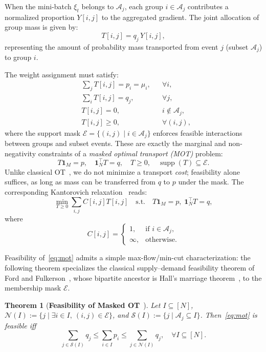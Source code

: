 \documentclass[9pt]{extarticle}
\newtheorem{theorem}{Theorem}
\theoremstyle{definition}
\renewcommand{\paragraph}[1]{\par\medskip\noindent{\bf #1}\hspace{0.5em}\ignorespaces}
\begin{document}
\paragraph{Weighted Gradient Aggregation.}
When the mini-batch $\xi_t$ belongs to $\mathcal{A}_j$, each group $i\in\mathcal{A}_j$ contributes a normalized proportion $Y[i,j]$ to the aggregated gradient. The joint allocation of group mass is given by:
\[
T[i,j] = q_j\,Y[i,j],
\]
representing the amount of probability mass transported from event $j$ (subset $\mathcal{A}_j$) to group $i$.

The weight assignment must satisfy:
\begin{align}\label{eq:constraints}
    &\sum_{j}T[i,j]=p_i=\mu_i, && \forall i, \nonumber\\
    &\sum_{i}T[i,j]=q_j, && \forall j, \nonumber\\
    &T[i,j]=0, && i\notin\mathcal{A}_j, \nonumber\\
    &T[i,j]\ge0, && \forall (i,j),
\end{align}
where the support mask $\mathcal{E}=\{(i,j)\mid i\in\mathcal{A}_j\}$ enforces feasible interactions between groups and subset events. These are exactly the marginal and non-negativity constraints of a \emph{masked optimal transport (MOT)} problem:
\begin{equation}\label{eq:mot}
T\mathbf{1}_M=p, \quad \mathbf{1}_N^\top T=q, \quad T\ge0, \quad \operatorname{supp}(T)\subseteq \mathcal{E}.
\end{equation}
Unlike classical OT~\cite{villani2009optimal, peyre2019computational}, we do not minimize a transport \emph{cost}; feasibility alone suffices, as long as mass can be transferred from $q$ to $p$ under the mask. The corresponding Kantorovich relaxation~\cite{kantorovich1942transfer} reads:
\begin{equation}\label{eq:kantorovich}
\min_{T\ge0}\sum_{i,j}C[i,j]T[i,j]\quad\text{s.t.}\quad T\mathbf{1}_M=p,\;\mathbf{1}_N^\top T=q,
\end{equation}
where
\[
C[i,j] =
\begin{cases}
1, & \text{if } i\in\mathcal{A}_j,\\
\infty, & \text{otherwise.}
\end{cases}
\]

Feasibility of~\eqref{eq:mot} admits a simple max-flow/min-cut characterization: the following theorem specializes the classical supply--demand feasibility theorem of Ford and Fulkerson~\cite{fordfulkerson1962flows}, whose bipartite ancestor is Hall's marriage theorem~\cite{hall1935representatives}, to the membership mask $\mathcal{E}$.
\begin{theorem}[\textbf{Feasibility of Masked OT}~\cite{fordfulkerson1962flows,hall1935representatives}]
\label{thm:feasibility}
Let $I\subseteq[N]$, $\mathcal{N}(I):=\{j\mid \exists i\in I,\ (i,j)\in\mathcal{E}\}$, and $\mathcal{S}(I):=\{j\mid \mathcal{A}_j\subseteq I\}$. Then~\eqref{eq:mot} is feasible iff
\begin{equation}\label{eq:feasibility}
\sum_{j\in\mathcal{S}(I)} q_j \le \sum_{i\in I} p_i \le \sum_{j\in\mathcal{N}(I)} q_j, \quad \forall I\subseteq[N].
\end{equation}
\end{theorem}
\end{document}
